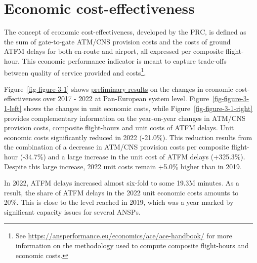 \documentclass[
  letterpaper,
  DIV=11,
  numbers=noendperiod]{scrreprt}
\begin{document}

\chapter{Economic cost-effectiveness}\label{sec-economic}

The concept of economic cost-effectiveness, developed by the PRC, is
defined as the sum of gate-to-gate ATM/CNS provision costs and the costs
of ground ATFM delays for both en‐route and airport, all expressed per
composite flight-hour. This economic performance indicator is meant to
capture trade‐offs between quality of service provided and
costs\footnote{See
  \url{https://ansperformance.eu/economics/ace/ace-handbook/} for more
  information on the methodology used to compute composite flight-hours
  and economic costs.}.

Figure~\ref{fig-figure-3-1} shows \ul{preliminary results} on the
changes in economic cost-effectiveness over 2017 - 2022 at Pan-European
system level. Figure~\ref{fig-figure-3-1-left} shows the changes in unit
economic costs, while Figure~\ref{fig-figure-3-1-right} provides
complementary information on the year-on-year changes in ATM/CNS
provision costs, composite flight-hours and unit costs of ATFM delays.
Unit economic costs significantly reduced in 2022 (-21.0\%). This
reduction results from the combination of a decrease in ATM/CNS
provision costs per composite flight-hour (-34.7\%) and a large increase
in the unit cost of ATFM delays (+325.3\%). Despite this large increase,
2022 unit costs remain +5.0\% higher than in 2019.

In 2022, ATFM delays increased almost six-fold to some 19.3M minutes. As
a result, the share of ATFM delays in the 2022 unit economic costs
amounts to 20\%. This is close to the level reached in 2019, which was a
year marked by significant capacity issues for several ANSPs.
\end{document}
